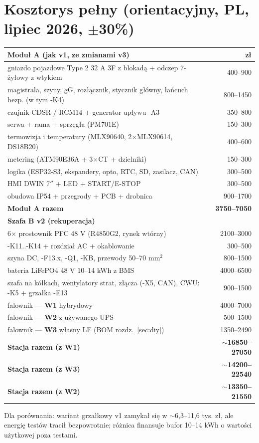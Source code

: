 \documentclass[11pt,a4paper]{article}
\begin{document}
\section{Kosztorys pełny (orientacyjny, PL, lipiec 2026, $\pm$30\%)}
\begin{longtable}{@{}p{}r@{}}
\toprule
\textbf{Moduł A (jak v1, ze zmianami v3)} & \textbf{zł}\\
\midrule
gniazdo pojazdowe Type 2 32 A 3F z blokadą + odczep 7-żyłowy z wtykiem & 400--900\\
magistrala, szyny, gG, rozłącznik, stycznik główny, łańcuch bezp. (w tym -K4) & 800--1450\\
czujnik CDSR / RCM14 + generator upływu -A3 & 350--800\\
serwa + rama + sprzęgła (PM701E) & 150--300\\
termowizja i temperatury (MLX90640, 2$\times$MLX90614, DS18B20) & 400--600\\
metering (ATM90E36A + 3$\times$CT + dzielniki) & 150--300\\
logika (ESP32-S3, ekspandery, opto, RTC, SD, zasilacz, CAN) & 300--500\\
HMI DWIN 7$''$ + LED + START/E-STOP & 300--500\\
obudowa IP54 + przegrody + PCB + drobnica & 900--1700\\
\midrule
\textbf{Moduł A razem} & \textbf{3750--7050}\\
\midrule
\textbf{Szafa B v2 (rekuperacja)} & \\
\midrule
6$\times$ prostownik PFC 48 V (R4850G2, rynek wtórny) & 2100--3000\\
-K11..-K14 + rozdział AC + okablowanie & 300--500\\
szyna DC, -F13.x, -Q1, -KB, przewody 50--70 mm$^2$ & 800--1500\\
bateria LiFePO4 48 V 10--14 kWh z BMS & 4000--6500\\
szafa na kółkach, wentylatory strat, złącza (-X5, CAN), CWU: -K5 + grzałka -E13 & 900--1500\\
falownik --- \textbf{W1} hybrydowy & 4000--7000\\
falownik --- \textbf{W2} z używanego UPS & 500--1500\\
falownik --- \textbf{W3} własny LF (BOM rozdz.~\ref{sec:diy}) & 1350--2490\\
\midrule
\textbf{Stacja razem (z W1)} & \textbf{$\sim$16850--27050}\\
\textbf{Stacja razem (z W3)} & \textbf{$\sim$14200--22540}\\
\textbf{Stacja razem (z W2)} & \textbf{$\sim$13350--21550}\\
\bottomrule
\end{longtable}
Dla porównania: wariant grzałkowy v1 zamykał się w $\sim$6,3--11,6 tys. zł, ale energię testów
tracił bezpowrotnie; różnica finansuje bufor 10--14 kWh o wartości użytkowej poza testami.
\end{document}
